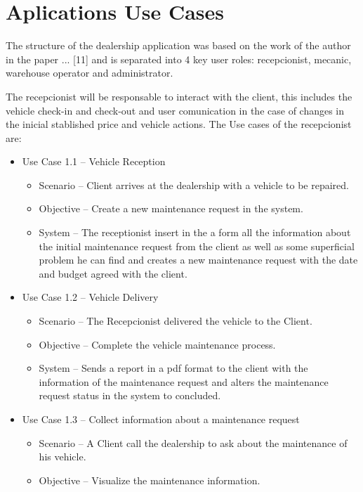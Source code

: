 \section{Aplications Use Cases}

The structure of the dealership application was based on the work of the author in the paper ... [11] and is separated into 4 key user roles: recepcionist, mecanic, warehouse operator and administrator.

The recepcionist will be responsable to interact with the client, this includes the vehicle check-in and check-out and user comunication in the case of changes in the inicial stablished price and vehicle actions. 
The Use cases of the recepcionist are:

\begin{itemize}
    \item Use Case 1.1 – Vehicle Reception
    \begin{itemize}
      \item Scenario – Client arrives at the dealership with a vehicle to be repaired.
      \item Objective – Create a new maintenance request in the system.
      \item System – The receptionist insert in the a form all the information about the initial maintenance request from the client as well as some superficial problem he can find and creates a new maintenance request with the date and budget agreed with the client. 
    \end{itemize}
    \item Use Case 1.2 – Vehicle Delivery 
    \begin{itemize}
      \item Scenario – The Recepcionist delivered the vehicle to the Client.
      \item Objective – Complete the vehicle maintenance process.
      \item System – Sends a report in a pdf format to the client with the information of the maintenance request and alters the maintenance request status in the system to concluded. 
    \end{itemize}
    \item Use Case 1.3 – Collect information about a maintenance request
    \begin{itemize}
      \item Scenario – A Client call the dealership to ask about the maintenance of his vehicle.
      \item Objective – Visualize the maintenance information.

\end{itemize}
\end{itemize}
